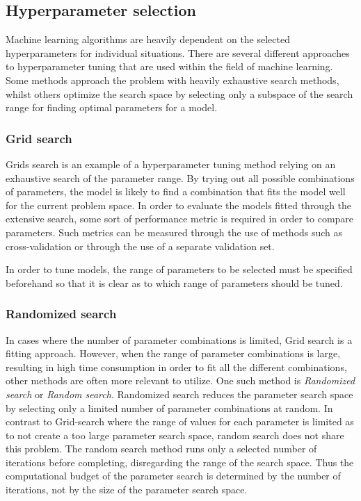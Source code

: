 \subsection{Hyperparameter selection}
\label{section:BT:Hyperparameters}

Machine learning algorithms are heavily dependent on the selected hyperparameters for individual situations.
There are several different approaches to hyperparameter tuning that are used within the field of machine learning.
Some methods approach the problem with heavily exhaustive search methods,
whilst others optimize the search space by selecting only a subspace of the search range for finding optimal parameters for a model.

\subsubsection{Grid search}
Grids search is an example of a hyperparameter tuning method relying on an exhaustive search of the parameter range.
By trying out all possible combinations of parameters, the model is likely to find a combination that fits the model well for the current problem space.
In order to evaluate the models fitted through the extensive search, some sort of performance metric is required in order to compare parameters.
Such metrics can be measured through the use of methods such as cross-validation or through the use of a separate validation set.

In order to tune models, the range of parameters to be selected must be specified beforehand so that it is clear as to which range of parameters should be tuned.
\cite{Geron2017}


\subsubsection{Randomized search}
In cases where the number of parameter combinations is limited, Grid search is a fitting approach.
However, when the range of parameter combinations is large, resulting in high time consumption in order to fit all the different combinations,
other methods are often more relevant to utilize.
One such method is \textit{Randomized search} or \textit{Random search}.
Randomized search reduces the parameter search space by selecting only a limited number of parameter combinations at random.
In contrast to Grid-search where the range of values for each parameter is limited as to not create a too large parameter search space,
random search does not share this problem.
The random search method runs only a selected number of iterations before completing, disregarding the range of the search space.
Thus the computational budget of the parameter search is determined by the number of iterations, not by the size of the parameter search space.
\cite{Geron2017}


